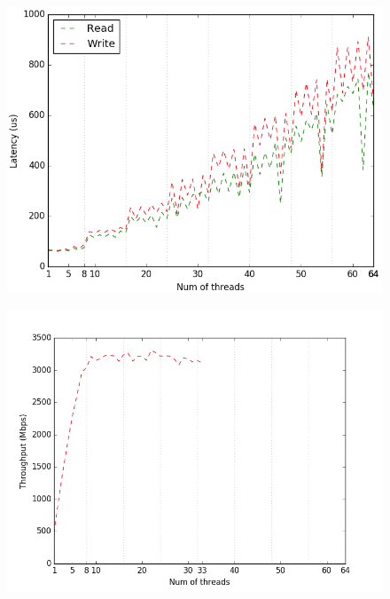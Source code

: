 \begin{figure}[H]
    \includegraphics[width=\columnwidth]{fig/latencyVsThreads}
    \caption{}
    \label{fig:latencyVsThreads}
\end{figure}

\begin{figure}[H]
    \includegraphics[width=\columnwidth]{fig/throughputVsManyThreads}
    \caption{}
    \label{fig:throughputVsManyThreads}
\end{figure}

